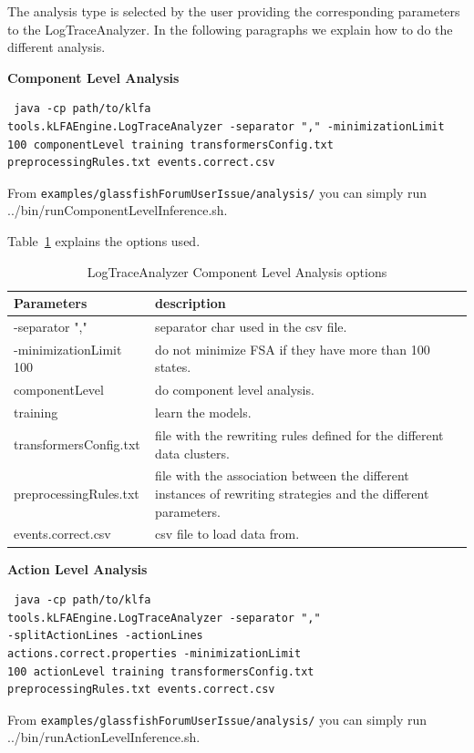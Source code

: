 The analysis type is selected by the user providing the corresponding
parameters to the LogTraceAnalyzer. In the following paragraphs we
explain how to do the different analysis.


\textbf{Component Level Analysis}

\begin{verbatim}
 java -cp path/to/klfa
tools.kLFAEngine.LogTraceAnalyzer -separator "," -minimizationLimit
100 componentLevel training transformersConfig.txt
preprocessingRules.txt events.correct.csv
\end{verbatim}

From \texttt{examples/glassfishForumUserIssue/analysis/} you can simply run
../bin/runComponentLevelInference.sh.

Table~\ref{clat} explains the options used.

\begin{table}
 \begin{tabular}{|p{6cm}|p{10cm}|}
 \hline
Parameters&description\\
\hline
-separator ","&separator char used in the csv file.\\
\hline
-minimizationLimit 100&do not minimize FSA if they have more than 100
states.\\
\hline
componentLevel&do component level analysis.\\
\hline
training&learn the models.\\
\hline
transformersConfig.txt&file with the rewriting rules defined for the
different data clusters.\\
\hline
preprocessingRules.txt&file with the association between the
different instances of rewriting strategies and the different
parameters.\\
\hline
events.correct.csv&csv file to load data from.\\
\hline
\end{tabular}
\label{clat}
\caption{LogTraceAnalyzer Component Level Analysis options}
\end{table}


\textbf{Action Level Analysis}

\begin{verbatim}
 java -cp path/to/klfa
tools.kLFAEngine.LogTraceAnalyzer -separator ","
-splitActionLines -actionLines
actions.correct.properties -minimizationLimit
100 actionLevel training transformersConfig.txt
preprocessingRules.txt events.correct.csv
\end{verbatim}

From \texttt{examples/glassfishForumUserIssue/analysis/} you can simply run
../bin/runActionLevelInference.sh.

